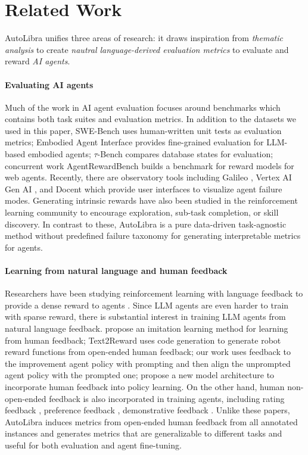 \section{Related Work}
AutoLibra unifies three areas of research: it draws inspiration from \textit{thematic analysis} to create \textit{nautral language-derived evaluation metrics} to evaluate and reward \textit{AI agents}. 

\paragraph{Evaluating AI agents} Much of the work in AI agent evaluation focuses around benchmarks which contains both task suites and evaluation metrics. In addition to the datasets we used in this paper, SWE-Bench \citep{jimenezswe} uses human-written unit tests as evaluation metrics; Embodied Agent Interface \citep{li2024embodied} provides fine-grained evaluation for LLM-based embodied agents; $\tau$-Bench \citep{yao2024tau} compares database states for evaluation; concurrent work AgentRewardBench \citep{lù2025agentrewardbenchevaluatingautomaticevaluations} builds a benchmark for reward models for web agents. Recently, there are observatory tools including Galileo \citep{galileo_agentic}, Vertex AI Gen AI \citep{google_agent_eval}, and Docent \citep{meng2025docent} which provide user interfaces to visualize agent failure modes. Generating intrinsic rewards have also been studied in the reinforcement learning community \citep{du2019liir,pathakICMl17curiosity,laskin2022cic} to encourage exploration, sub-task completion, or skill discovery. In contrast to these, AutoLibra is a pure data-driven task-agnostic method without predefined failure taxonomy for generating interpretable metrics for agents. 

\paragraph{Learning from natural language and human feedback} Researchers have been studying reinforcement learning with language feedback to provide a dense reward to agents \citep{goyal2019using}. Since LLM agents are even harder to train with sparse reward, there is substantial interest in training LLM agents from natural language feedback. \citet{chen2024learning} propose an imitation learning method for learning from human feedback; Text2Reward \citep{xietext2reward} uses code generation to generate robot reward functions from open-ended human feedback; our work \citep{chen2025fine} uses feedback to the improvement agent policy with prompting and then align the unprompted agent policy with the prompted one; \citet{shi2024yell} propose a new model architecture to incorporate human feedback into policy learning. On the other hand, human non-open-ended feedback is also incorporated in training agents, including rating feedback \citep{nguyen2017reinforcement}, preference feedback \citep{christiano2017deep}, demonstrative feedback \citep{shaikhaligning}.
Unlike these papers, AutoLibra induces metrics from open-ended human feedback from all annotated instances and generates metrics that are generalizable to different tasks and useful for both evaluation and agent fine-tuning.

